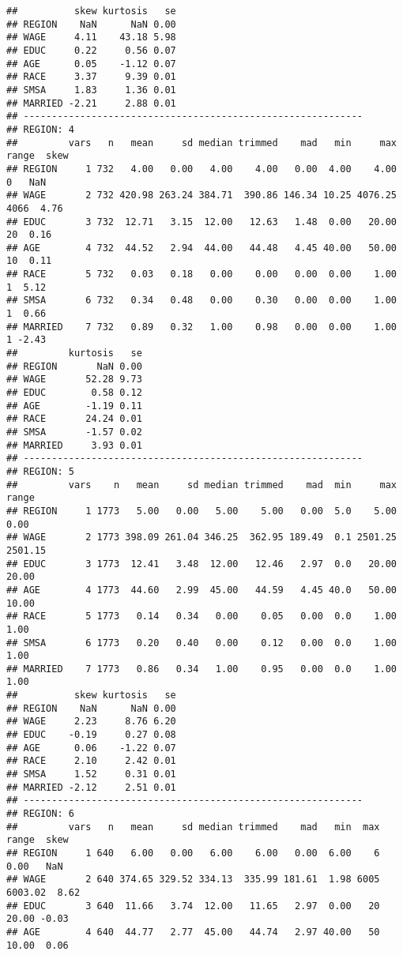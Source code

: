 \documentclass[
]{article}
\begin{document}
\begin{verbatim}
##          skew kurtosis   se
## REGION    NaN      NaN 0.00
## WAGE     4.11    43.18 5.98
## EDUC     0.22     0.56 0.07
## AGE      0.05    -1.12 0.07
## RACE     3.37     9.39 0.01
## SMSA     1.83     1.36 0.01
## MARRIED -2.21     2.88 0.01
## ------------------------------------------------------------ 
## REGION: 4
##         vars   n   mean     sd median trimmed    mad   min     max range  skew
## REGION     1 732   4.00   0.00   4.00    4.00   0.00  4.00    4.00     0   NaN
## WAGE       2 732 420.98 263.24 384.71  390.86 146.34 10.25 4076.25  4066  4.76
## EDUC       3 732  12.71   3.15  12.00   12.63   1.48  0.00   20.00    20  0.16
## AGE        4 732  44.52   2.94  44.00   44.48   4.45 40.00   50.00    10  0.11
## RACE       5 732   0.03   0.18   0.00    0.00   0.00  0.00    1.00     1  5.12
## SMSA       6 732   0.34   0.48   0.00    0.30   0.00  0.00    1.00     1  0.66
## MARRIED    7 732   0.89   0.32   1.00    0.98   0.00  0.00    1.00     1 -2.43
##         kurtosis   se
## REGION       NaN 0.00
## WAGE       52.28 9.73
## EDUC        0.58 0.12
## AGE        -1.19 0.11
## RACE       24.24 0.01
## SMSA       -1.57 0.02
## MARRIED     3.93 0.01
## ------------------------------------------------------------ 
## REGION: 5
##         vars    n   mean     sd median trimmed    mad  min     max   range
## REGION     1 1773   5.00   0.00   5.00    5.00   0.00  5.0    5.00    0.00
## WAGE       2 1773 398.09 261.04 346.25  362.95 189.49  0.1 2501.25 2501.15
## EDUC       3 1773  12.41   3.48  12.00   12.46   2.97  0.0   20.00   20.00
## AGE        4 1773  44.60   2.99  45.00   44.59   4.45 40.0   50.00   10.00
## RACE       5 1773   0.14   0.34   0.00    0.05   0.00  0.0    1.00    1.00
## SMSA       6 1773   0.20   0.40   0.00    0.12   0.00  0.0    1.00    1.00
## MARRIED    7 1773   0.86   0.34   1.00    0.95   0.00  0.0    1.00    1.00
##          skew kurtosis   se
## REGION    NaN      NaN 0.00
## WAGE     2.23     8.76 6.20
## EDUC    -0.19     0.27 0.08
## AGE      0.06    -1.22 0.07
## RACE     2.10     2.42 0.01
## SMSA     1.52     0.31 0.01
## MARRIED -2.12     2.51 0.01
## ------------------------------------------------------------ 
## REGION: 6
##         vars   n   mean     sd median trimmed    mad   min  max   range  skew
## REGION     1 640   6.00   0.00   6.00    6.00   0.00  6.00    6    0.00   NaN
## WAGE       2 640 374.65 329.52 334.13  335.99 181.61  1.98 6005 6003.02  8.62
## EDUC       3 640  11.66   3.74  12.00   11.65   2.97  0.00   20   20.00 -0.03
## AGE        4 640  44.77   2.77  45.00   44.74   2.97 40.00   50   10.00  0.06

\end{verbatim}
\end{document}
